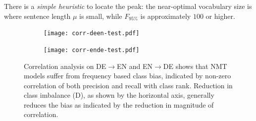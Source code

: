  There is a \textit{simple heuristic} to locate the peak: the near-optimal vocabulary size is where sentence length $\mu$ is small, while $F_{95\%}$ is approximately $100$ or higher.
 
 
 \begin{figure}[h!t]
    \centering
    \begin{subfigure}{0.8\textwidth}
    \texttt{[image: corr-deen-test.pdf]}
    \end{subfigure}
    
    \vspace{5mm}

    \begin{subfigure}{0.8\textwidth}
    \texttt{[image: corr-ende-test.pdf]}
    \end{subfigure}
    
    \caption{Correlation analysis on DE$\rightarrow$EN and EN$\rightarrow$DE shows that NMT models suffer from frequency based class bias, indicated by non-zero correlation of both precision and recall with class rank. Reduction in class imbalance (D), as shown by the horizontal axis, generally reduces the bias as indicated by the reduction in magnitude of correlation.}
         \label{fig:corr-deen-test}
\end{figure}
 
 

